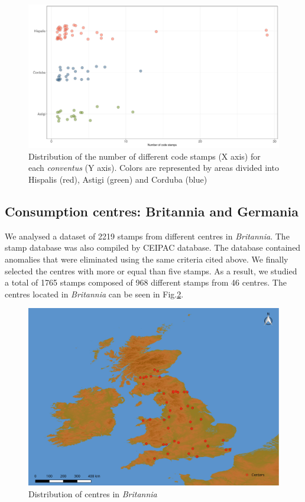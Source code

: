 \documentclass[review]{elsarticle}
\begin{document}
\begin{figure}[htp]
	\centering
\includegraphics[width=\linewidth]{figs/frequency}
\caption{Distribution of the number of different code stamps (X axis) for each \textit{conventus} (Y axis). Colors are represented by areas divided into Hispalis (red), Astigi (green) and Corduba (blue)}
\label{frequency}
\end{figure} 


\subsection{Consumption centres: Britannia and Germania}


We analysed a dataset of 2219 stamps from different centres in \textit{Britannia}. 
The stamp database was also compiled by CEIPAC database. The database contained anomalies that were eliminated using the same criteria cited above. We finally selected the centres with more or equal than five stamps. As a result, we studied a total of 1765 stamps composed of 968 different stamps from 46 centres.
The centres located in \textit{Britannia} can be seen in Fig.\ref{britannia}.
 
\begin{figure}[htp]
	\centering
\includegraphics[width=\linewidth]{figs/britmap2.pdf}
\caption{Distribution of centres in \textit{Britannia}}
\label{britannia}
\end{figure} 
\end{document}

